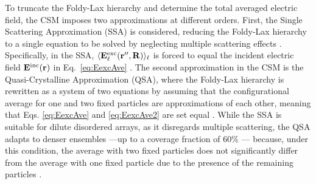 To truncate the Foldy-Lax hierarchy and determine the total averaged electric field, the CSM imposes two approximations at different orders. First, the Single Scattering Approximation (SSA) is considered, reducing the Foldy-Lax hierarchy to a single equation to be solved by neglecting multiple scattering effects \cite{barrera_coherent_2003}. Specifically, in the SSA, $\langle\vb{E}_\ell^\text{exc}(\vb{r}'',\vb{R})\rangle_\ell$ is forced to equal the incident electric field $\vb{E}^\text{inc}(\vb{r})$ in Eq.~\eqref{eq:EexcAve} \cite{loiko_monolayers_1998,garcia2012multiple}. The second approximation in the CSM is the Quasi-Crystalline Approximation (QSA), where the Foldy-Lax hierarchy is rewritten as a system of two equations by assuming that the configurational average for one and two fixed particles are approximations of each  other, meaning that Eqs. \eqref{eq:EexcAve} and \eqref{eq:EexcAve2} are set equal \cite{loiko_monolayers_1998,barrera_coherent_2003}. While the SSA is suitable for dilute disordered arrays, as it disregards multiple scattering, the QSA adapts to denser ensembles ---up to a coverage fraction of 60\% \cite{loiko_monolayers_1998}--- because, under this condition, the average with two fixed particles does not significantly differ from the average with one fixed particle due to the presence of the remaining particles \cite{barrera_coherent_2003}.

